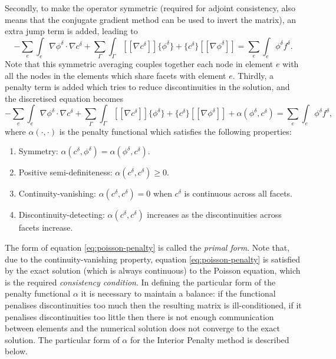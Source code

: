 Secondly, to make the operator symmetric (required for adjoint
consistency, also means that the conjugate gradient method can be used
to invert the matrix), an extra jump term is added, leading to
\begin{equation}
\label{eq:poisson-parts-facets-average-symmetric}
-\sum_e\int_e\nabla \phi^\delta\cdot\nabla c^\delta +
\sum_\Gamma\int_{\Gamma} [[\nabla c^\delta]]\{\phi^\delta\} +
\{c^\delta\}
[[\nabla\phi^\delta]] = \sum_e\int_e \phi^\delta f^{\delta}.
\end{equation}
Note that this symmetric averaging couples together each node in
element $e$ with all the nodes in the elements which share facets with
element $e$. Thirdly, a penalty term is added which tries to reduce
discontinuities in the solution, and the discretised equation becomes
\begin{equation}
\label{eq:poisson-penalty}
-\sum_e\int_e\nabla \phi^\delta\cdot\nabla c^\delta +
\sum_\Gamma\int_{\Gamma} [[\nabla c^\delta]]\{\phi^\delta\} +
\{c^\delta\}
[[\nabla\phi^\delta]] + \alpha(\phi^\delta,c^\delta)
= \sum_e\int_e \phi^\delta f^{\delta},
\end{equation}
where $\alpha(\cdot,\cdot)$ is the penalty functional which satisfies
the following properties:
\begin{enumerate}
\item Symmetry:
  $\alpha(c^\delta,\phi^\delta)=\alpha(\phi^\delta,c^\delta)$.
\item Positive semi-definiteness: $\alpha(c^\delta,c^\delta)\geq 0$.
\item Continuity-vanishing: $\alpha(c^\delta,c^\delta)=0$ when $c^\delta$ is continuous
 across all facets.
\item Discontinuity-detecting: $\alpha(c^\delta,c^\delta)$ increases
  as the discontinuities across facets increase.
\end{enumerate}
The form of equation \eqref{eq:poisson-penalty} is called the
\emph{primal form}.  Note that, due to the continuity-vanishing
property, equation \eqref{eq:poisson-penalty} is satisfied by the
exact solution (which is always continuous) to the Poisson equation,
which is the required \emph{consistency condition}.  In defining the
particular form of the penalty functional $\alpha$ it is necessary to
maintain a balance: if the functional penalises discontinuities too
much then the resulting matrix is ill-conditioned, if it penalises
discontinuities too little then there is not enough communication
between elements and the numerical solution does not converge to the
exact solution. The particular form of $\alpha$ for the Interior
Penalty method is described below.

